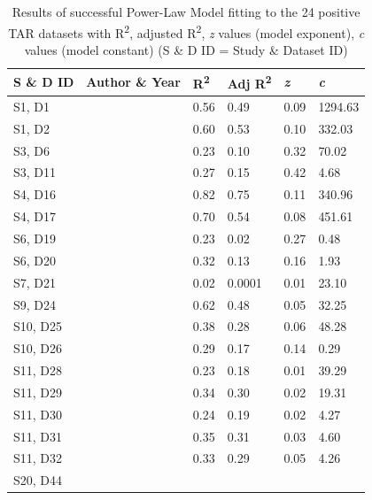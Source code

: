 \begin{table}[h]
    \caption{Results of successful Power-Law Model fitting to the 24 positive TAR datasets with R\textsuperscript{2}, adjusted R\textsuperscript{2}, \textit{z} values (model exponent), \textit{c} values (model constant) (S \& D ID = Study \& Dataset ID)}
    \label{crouch}
    \begin{tabular}{  l  p{6cm} p{1cm}  p{1cm} p{1cm} p{1cm}}
        \toprule
\textbf{S \& D ID} 
&\textbf{Author \& Year}
&\textbf{R\textsuperscript{2}}      
& \textbf{Adj R\textsuperscript{2}}
& \textit{z}  
& \textit{c}\\\midrule
S1, D1
&\cite{li2020island}
& 0.56
& 0.49
& 0.09
& 1294.63 \\\hline
S1, D2
&\cite{li2020island}
& 0.60
& 0.53
& 0.10
& 332.03 \\\hline
S3, D6
&\cite{darcy2018island} 
& 0.23
& 0.10
& 0.32
& 70.02 \\\hline
S3, D11
&\cite{darcy2018island} 
& 0.27
& 0.15
& 0.42
& 4.68\\\hline
S4, D16
&\cite{delgado2018experimentally} 
& 0.82
& 0.75
& 0.11
& 340.96 \\\hline
S4, D17
&\cite{delgado2018experimentally} 
& 0.70
& 0.54
& 0.08
& 451.61 \\\hline
S6, D19
&\cite{glassman2017theory} 
& 0.23
& 0.02
& 0.27
& 0.48 \\\hline
S6, D20
&\cite{glassman2017theory} 
& 0.32
& 0.13
& 0.16
& 1.93 \\\hline
S7, D21
&\cite{varbiro2017functional} 
& 0.02
& 0.0001
& 0.01
& 23.10 \\\hline
S9, D24
&\cite{bolgovics2016species} 
& 0.62
& 0.48
& 0.05
& 32.25 \\\hline
S10, D25
&\cite{article} 
& 0.38
& 0.28
& 0.06
& 48.28 \\\hline
S10, D26 
&\cite{article} 
& 0.29
& 0.17
& 0.14
& 0.29 \\\hline
S11, D28
&\cite{jean2016equilibrium} 
& 0.23
& 0.18
& 0.01
& 39.29 \\\hline
S11, D29
&\cite{jean2016equilibrium} 
& 0.34
& 0.30
& 0.02
& 19.31 \\\hline
S11, D30
&\cite{jean2016equilibrium} 
& 0.24
& 0.19
& 0.02
& 4.27 \\\hline
S11, D31 
&\cite{jean2016equilibrium} 
& 0.35
& 0.31
& 0.03
& 4.60 \\\hline
S11, D32
&\cite{jean2016equilibrium} 
& 0.33
& 0.29
& 0.05
& 4.26 \\\hline
S20, D44
&\cite{peay2007strong} 

\end{tabular}
\end{table}
